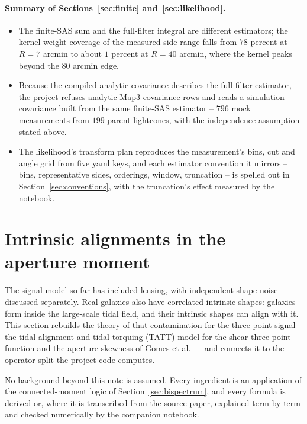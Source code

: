 \documentclass[11pt]{article}
\numberwithin{equation}{section}
\begin{document}
\paragraph{Summary of Sections~\ref{sec:finite}
and~\ref{sec:likelihood}.}
\begin{itemize}
  \item The finite-SAS sum and the full-filter integral are
    different estimators; the kernel-weight coverage of the measured
    side range falls from $78$ percent at $R = 7$ arcmin to about
    $1$ percent at $R = 40$ arcmin, where the kernel peaks beyond
    the $80$ arcmin edge.
  \item Because the compiled analytic covariance describes the
    full-filter estimator, the project refuses analytic Map3
    covariance rows and reads a simulation covariance built from
    the same finite-SAS estimator -- $796$ mock measurements from $199$
    parent lightcones, with the independence assumption stated above.
  \item The likelihood's transform plan reproduces the
    measurement's bins, cut and angle grid from five yaml keys, and
    each estimator convention it mirrors -- bins, representative
    sides, orderings, window, truncation -- is spelled out in
    Section~\ref{sec:conventions}, with the truncation's effect
    measured by the notebook.
\end{itemize}
\section{Intrinsic alignments in the aperture moment}
\label{sec:ia}

The signal model so far has included lensing, with independent shape
noise discussed separately. Real galaxies also have correlated intrinsic
shapes: galaxies form inside the large-scale tidal
field, and their intrinsic shapes can align with it.  This section
rebuilds the theory of that contamination for the three-point
signal -- the tidal alignment and tidal torquing (TATT) model for the
shear three-point function and the aperture skewness of Gomes et
al.~\cite{GomesTATT} -- and connects it to the operator split the
project code computes.

No background beyond this note is assumed.  Every ingredient is an
application of the connected-moment logic of
Section~\ref{sec:bispectrum}, and every formula is derived or, where
it is transcribed from the source paper, explained term by term and
checked numerically by the companion notebook.
\end{document}
